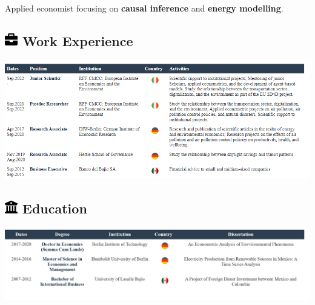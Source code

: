 \documentclass[
  10pt,
  letterpaper,
  DIV=11,
  numbers=noendperiod]{scrartcl}
\begin{document}
Applied economist focusing on \textbf{causal inference} and
\textbf{energy modelling}.

\hypertarget{work-experience}{%
\subsection[ Work Experience
\vspace{-0.5cm}]{\texorpdfstring{\protect\includegraphics[width=1em,height=1em]{cv_pdf_files/figure-pdf/fa-icon-65a83bdea6161284dcc1b960352dd7dd.pdf}
Work Experience
\vspace{-0.5cm}}{ Work Experience }}\label{work-experience}}

\hrulefill

\vspace{-0.15cm}

\includegraphics{cv_pdf_files/figure-pdf/unnamed-chunk-1-1.png}

\hypertarget{education}{%
\subsection[ Education
\vspace{-0.5cm}]{\texorpdfstring{\protect\includegraphics[width=1em,height=1em]{cv_pdf_files/figure-pdf/fa-icon-2d63498385de2eb86c2b263aaf24cf57.pdf}
Education \vspace{-0.5cm}}{ Education }}\label{education}}

\hrulefill

\vspace{-0.15cm}

\includegraphics{cv_pdf_files/figure-pdf/unnamed-chunk-2-1.png}
\end{document}
